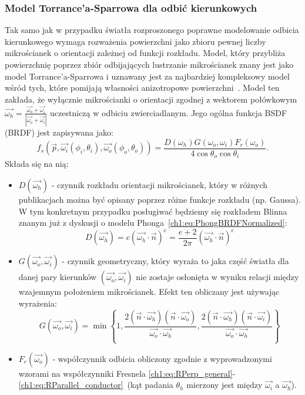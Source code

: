 \subsubsection{Model Torrance'a-Sparrowa dla odbić kierunkowych}
Tak samo jak w przypadku światła rozproszonego poprawne modelowanie odbicia kierunkowego wymaga rozważenia powierzchni jako zbioru pewnej liczby mikrościanek o orientacji zależnej od funkcji rozkładu. Model, który przybliża powierzchnię poprzez zbiór odbijających lustrzanie mikrościanek znany jest jako model Torrance'a-Sparrowa i uznawany jest za najbardziej kompleksowy model wśród tych, które pomijają własności anizotropowe powierzchni~\cite{Meister98investigationon}\cite{PBRT}. Model ten zakłada, że wyłącznie mikrościanki o orientacji zgodnej z wektorem połówkowym $\vec{\omega_h} = \frac{\vec{\omega_o} + \vec{\omega_i}}{|\vec{\omega_o} + \vec{\omega_i}|}$ uczestniczą w odbiciu zwierciadlanym.
Jego ogólna funkcja BSDF (BRDF) jest zapisywana jako:
\begin{equation}
f_s(\vec{p}, \vec{\omega_i}(\phi_i, \theta_i), \vec{\omega_o}(\phi_o, \theta_o)) = \frac{D(\omega_h)G(\omega_o, \omega_i)F_r(\omega_o)}{4\cos\theta_o\cos\theta_i}.
\label{ch1:eq:TorranceSparrowFull}
\end{equation}
Składa się na nią:
\begin{itemize}
\item[] $D(\vec{\omega_h})$ - czynnik rozkładu orientacji mikrościanek, który w różnych publikacjach można być opisany poprzez różne funkcje rozkładu (np. Gaussa). W tym konkretnym przypadku posługiwać będziemy się rozkładem Blinna znanym już z dyskusji o modelu Phonga~\eqref{ch1:eq:PhongBRDFNormalized}:
\begin{equation}
D(\vec{\omega_h}) = c(\vec{\omega_h}\cdot\vec{n})^e = \frac{e + 2}{2\pi}(\vec{\omega_h}\cdot\vec{n})^e
\end{equation}
\item[] $G(\vec{\omega_o}, \vec{\omega_i})$ - czynnik geometryczny, który wyraża to jaka część światła dla danej pary kierunków $(\vec{\omega_o}, \vec{\omega_i})$ nie zostaje osłonięta w wyniku relacji między wzajemnym położeniem mikrościanek. Efekt ten obliczany jest używając wyrażenia:
\begin{equation}
G(\vec{\omega_o}, \vec{\omega_i}) = \min\left\lbrace 1, \frac{2(\vec{n}\cdot\vec{\omega_h})(\vec{n}\cdot\vec{\omega_o})}{\vec{\omega_o}\cdot\vec{\omega_h}}, \frac{2(\vec{n}\cdot\vec{\omega_h})(\vec{n}\cdot\vec{\omega_i})}{\vec{\omega_o}\cdot\vec{\omega_h}} \right\rbrace
\end{equation}
\item[] $F_r(\vec{\omega_o})$ - współczynnik odbicia obliczony zgodnie z wyprowadzonymi wzorami na współczynniki Fresnela \eqref{ch1:eq:RPerp_general}-\eqref{ch1:eq:RParallel_conductor}~(kąt padania $\theta_h$ mierzony jest między $\vec{\omega_i}$ a $\vec{\omega_h}$). 
\end{itemize}

